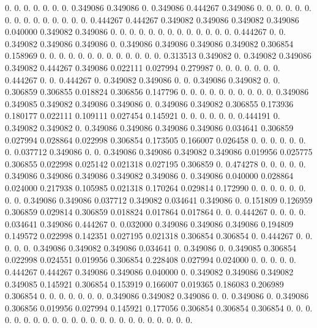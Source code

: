 0.  0.  0.  0.  0.  0.  0.  0.349086   0.349086   0.  0.349086   0.444267   0.349086   0.  0.  0.  0.  0.  0.  0.  0.  0.  0.  
0.  0.  0.  0.  0.  0.444267   0.444267   0.349082   0.349086   0.349082   0.349086   0.040000   0.349082   0.349086   0.  0.  0.  0.  0.  0.  0.  0.  0.  
0.  0.  0.  0.  0.444267   0.  0.  0.349082   0.349086   0.349086   0.  0.349086   0.349086   0.349086   0.349082   0.306854   0.158969   0.  0.  0.  0.  0.  0.  
0.  0.  0.  0.  0.  0.  0.  0.313513   0.349082   0.  0.349082   0.349086   0.349082   0.444267   0.349086   0.022111   0.027994   0.279987   0.  0.  0.  0.  0.  
0.  0.  0.444267   0.  0.  0.444267   0.  0.349082   0.349086   0.  0.  0.349086   0.349082   0.  0.  0.306859   0.306855   0.018824   0.306856   0.147796   0.  0.  0.  
0.  0.  0.  0.  0.  0.  0.  0.349086   0.349085   0.349082   0.349086   0.349086   0.  0.349086   0.349082   0.306855   0.173936   0.180177   0.022111   0.109111   0.027454   0.145921   0.  
0.  0.  0.  0.  0.  0.444191   0.  0.349082   0.349082   0.  0.349086   0.349086   0.349086   0.349086   0.034641   0.306859   0.027994   0.028864   0.022998   0.306854   0.173505   0.166007   0.026458   
0.  0.  0.  0.  0.  0.  0.  0.037712   0.349086   0.  0.  0.349086   0.349086   0.349082   0.349086   0.019956   0.025775   0.306855   0.022998   0.025142   0.021318   0.027195   0.306859   
0.  0.474278   0.  0.  0.  0.  0.  0.349086   0.349086   0.349086   0.349082   0.349086   0.  0.349086   0.040000   0.028864   0.024000   0.217938   0.105985   0.021318   0.170264   0.029814   0.172990   
0.  0.  0.  0.  0.  0.  0.  0.  0.349086   0.349086   0.037712   0.349082   0.034641   0.349086   0.  0.151809   0.126959   0.306859   0.029814   0.306859   0.018824   0.017864   0.017864   
0.  0.  0.444267   0.  0.  0.  0.  0.034641   0.349086   0.444267   0.  0.032000   0.349086   0.349086   0.349086   0.194809   0.149572   0.022998   0.142351   0.027195   0.021318   0.306854   0.306854   
0.  0.444267   0.  0.  0.  0.  0.  0.349086   0.349082   0.349086   0.034641   0.  0.349086   0.  0.349085   0.306854   0.022998   0.024551   0.019956   0.306854   0.228408   0.027994   0.024000   
0.  0.  0.  0.  0.  0.444267   0.444267   0.349086   0.349086   0.040000   0.  0.349082   0.349086   0.349082   0.349085   0.145921   0.306854   0.153919   0.166007   0.019365   0.186083   0.206989   0.306854   
0.  0.  0.  0.  0.  0.  0.  0.349086   0.349082   0.349086   0.  0.  0.349086   0.  0.349086   0.306856   0.019956   0.027994   0.145921   0.177056   0.306854   0.306854   0.306854   
0.  0.  0.  0.  0.  0.  0.  0.  0.  0.  0.  0.  0.  0.  0.  0.  0.  0.  0.  0.  0.  0.  0.  
